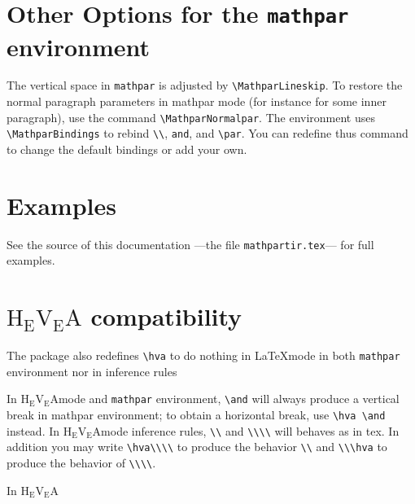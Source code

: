 \documentclass {article}
\def \L#1{\lower 0.4ex \hbox {#1}}
\def \R#1{\raise 0.4ex \hbox {#1}}
\def \hevea {H\L{E}\R{V}\L{E}A}
\def \hevea {$\mbox {H}\!_{\mbox {E}}\!\mbox {V}\!_{\mbox {E}}\!\mbox {A}$}
\let \lst \verb
\begin{document}
\section {Other Options for the {\tt mathpar} environment}

The vertical space in \verb"mathpar" is adjusted by
\verb"\MathparLineskip". To restore the normal paragraph parameters in mathpar
mode (for instance for some inner paragraph), use the command
\verb"\MathparNormalpar".
The environment uses \verb"\MathparBindings" to
rebind \verb"\\", \verb"and", and \verb"\par". You can redefine thus command
to change the default bindings or add your own.


\section {Examples}

See the source of this documentation ---the file \lst"mathpartir.tex"---
for full examples.

\section {{\hevea} compatibility}

The package also redefines \verb"\hva" to do nothing in \LaTeX mode in
both \lst"mathpar" environment nor in inference rules

In \hevea mode and \verb"mathpar" environment, \verb"\and" will always
produce a vertical break in mathpar environment; to obtain a horizontal
break, use \verb"\hva \and" instead.
In \hevea mode inference rules, \verb"\\" and \verb"\\\\"
will behaves as in tex.  In addition you may write \verb"\hva\\\\" to
produce the behavior \verb"\\" and \verb"\\\hva" to produce the behavior of
\verb"\\\\".

In \hevea
\end{document}
